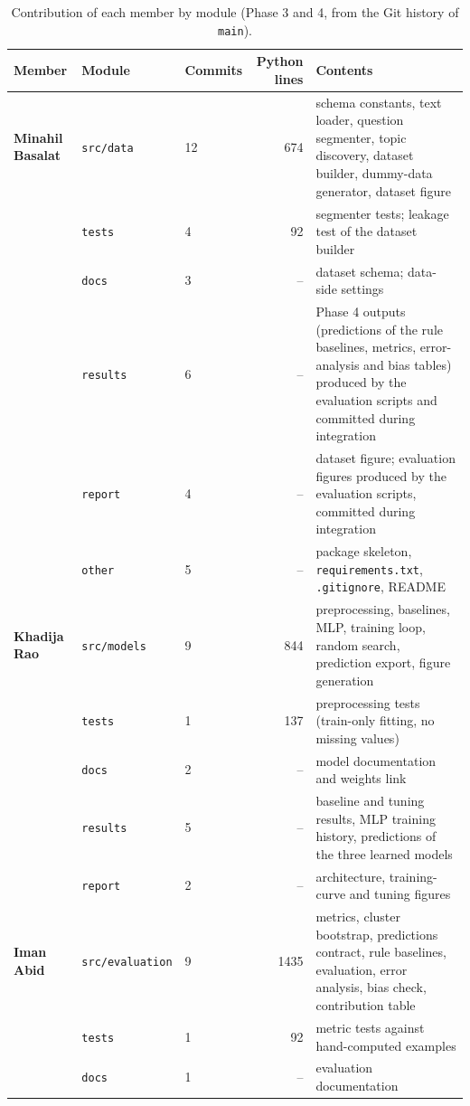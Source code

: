 \documentclass[11pt,a4paper]{article}
\begin{document}
\begin{table}[!htb]
\centering
\footnotesize
\begin{tabular}{lllrp{6.0cm}}
\toprule
Member & Module & Commits & Python lines & Contents \\
\midrule
\textbf{Minahil Basalat} & \texttt{src/data} & 12 & 674 & schema constants, text loader, question segmenter, topic discovery, dataset builder, dummy-data generator, dataset figure \\
 & \texttt{tests} & 4 & 92 & segmenter tests; leakage test of the dataset builder \\
 & \texttt{docs} & 3 & -- & dataset schema; data-side settings \\
 & \texttt{results} & 6 & -- & Phase 4 outputs (predictions of the rule baselines, metrics, error-analysis and bias tables) produced by the evaluation scripts and committed during integration \\
 & \texttt{report} & 4 & -- & dataset figure; evaluation figures produced by the evaluation scripts, committed during integration \\
 & \texttt{other} & 5 & -- & package skeleton, \texttt{requirements.txt}, \texttt{.gitignore}, README \\
\midrule
\textbf{Khadija Rao} & \texttt{src/models} & 9 & 844 & preprocessing, baselines, MLP, training loop, random search, prediction export, figure generation \\
 & \texttt{tests} & 1 & 137 & preprocessing tests (train-only fitting, no missing values) \\
 & \texttt{docs} & 2 & -- & model documentation and weights link \\
 & \texttt{results} & 5 & -- & baseline and tuning results, MLP training history, predictions of the three learned models \\
 & \texttt{report} & 2 & -- & architecture, training-curve and tuning figures \\
\midrule
\textbf{Iman Abid} & \texttt{src/evaluation} & 9 & 1435 & metrics, cluster bootstrap, predictions contract, rule baselines, evaluation, error analysis, bias check, contribution table \\
 & \texttt{tests} & 1 & 92 & metric tests against hand-computed examples \\
 & \texttt{docs} & 1 & -- & evaluation documentation \\
\bottomrule
\end{tabular}
\caption{Contribution of each member by module (Phase 3 and 4, from the Git history of \texttt{main}).}
\label{tab:contrib}
\end{table}
\end{document}
